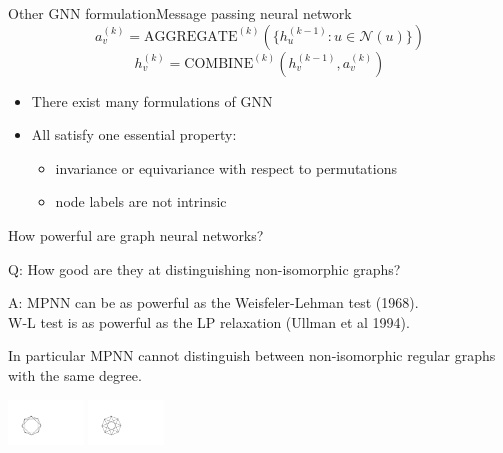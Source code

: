 \documentclass{beamer}
\begin{document}
\begin{frame}{Other GNN formulation}{Message passing neural network}
$$a^{(k)}_v=\text{AGGREGATE}^{(k)}\left(\{h_u^{(k-1)}: u\in \mathcal N(u)\} \right)$$
$$h^{(k)}_v=\text{COMBINE}^{(k)}\left( h_v^{(k-1)}, a_v^{(k)} \right)
$$
\pause
\begin{itemize}
\item There exist many formulations of GNN
\item All satisfy one essential property: 
\begin{itemize}
\item invariance or equivariance with respect to permutations
\item node labels are not intrinsic
\end{itemize}
\end{itemize}


\let\thefootnote\relax{}

\end{frame}

\begin{frame}{How powerful are graph neural networks?}

Q: How good are they at distinguishing non-isomorphic graphs?
\pause
\bigskip

A: MPNN can be as powerful as the Weisfeler-Lehman test (1968).
\\
W-L test is as powerful as the LP relaxation (Ullman et al 1994). 

\pause
\bigskip

In particular MPNN cannot distinguish between non-isomorphic regular graphs with the same degree. 
\begin{center}
    \includegraphics[width=0.15\textwidth,trim={6cm 4.8cm 20cm 7.8cm},clip]{figs/skl2black}
    \includegraphics[width=0.15\textwidth,trim={6cm 4.8cm 20cm 7.8cm},clip]{figs/skl3black}
\end{center}
 
\let\thefootnote\relax{}
\end{frame}
\end{document}
